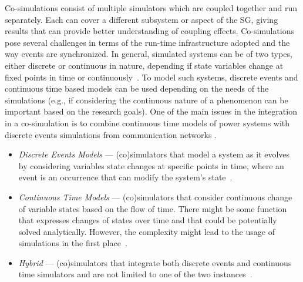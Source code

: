 \documentclass[1p]{elsarticle} %
\begin{document}

Co-simulations consist of multiple simulators which are coupled together and run separately. Each can cover a different subsystem or aspect of the SG, giving results that can provide better understanding of coupling effects. Co-simulations pose several challenges in terms of the run-time infrastructure adopted and the way events are synchronized. In general, simulated systems can be of two types, either discrete or continuous in nature, depending if state variables change at fixed points in time or continuously~\citep{ref:law2000simulation}. To model such systems, discrete events and continuous time based models can be used depending on the needs of the simulations (e.g., if considering the continuous nature of a phenomenon can be important based on the research goals). One of the main issues in the integration in a co-simulation is to combine continuous time models of power systems with discrete events simulations from communication networks \citep{ref:mets2014combining}.  

\begin{itemize}
    \item \textit{Discrete Events Models} --- (co)simulators that model a system as it evolves by considering variables state changes at specific points in time, where an event is an occurrence that can modify the system's state~\citep{ref:law2000simulation}.
    \item \textit{Continuous Time Models} --- (co)simulators that consider continuous change of variable states based on the flow of time. There might be some function that expresses changes of states over time and that could be potentially solved analytically. However, the complexity might lead to the usage of simulations in the first place~\citep{ref:law2000simulation}.
        \item \textit{Hybrid } --- (co)simulators that integrate both discrete events and continuous time simulators and are not limited to one of the two instances~\citep{ref:gomes2018co-sim-survey-acm}.
\end{itemize}
\end{document}

